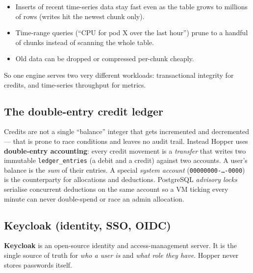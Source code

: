 \documentclass[11pt,a4paper]{article}
\newcommand{\code}[1]{\texttt{\small #1}}
\begin{document}
\begin{itemize}[nosep]
  \item Inserts of recent time-series data stay fast even as the table grows to
        millions of rows (writes hit the newest chunk only).
  \item Time-range queries (``CPU for pod X over the last hour'') prune to a
        handful of chunks instead of scanning the whole table.
  \item Old data can be dropped or compressed per-chunk cheaply.
\end{itemize}

\noindent
So one engine serves two very different workloads: transactional integrity for
credits, and time-series throughput for metrics.

\subsection{The double-entry credit ledger}

Credits are not a single ``balance'' integer that gets incremented and
decremented --- that is prone to race conditions and leaves no audit trail.
Instead Hopper uses \textbf{double-entry accounting}: every credit movement is a
\emph{transfer} that writes two immutable \code{ledger\_entries} (a debit and a
credit) against two accounts. A user's balance is the \emph{sum} of their
entries. A special \emph{system account} (\code{00000000-\dots-0000}) is the
counterparty for allocations and deductions. PostgreSQL \emph{advisory locks}
serialise concurrent deductions on the same account so a VM ticking every minute
can never double-spend or race an admin allocation.

\subsection{Keycloak (identity, SSO, OIDC)}

\textbf{Keycloak} is an open-source identity and access-management server. It is
the single source of truth for \emph{who a user is} and \emph{what role they
have}. Hopper never stores passwords itself.
\end{document}
